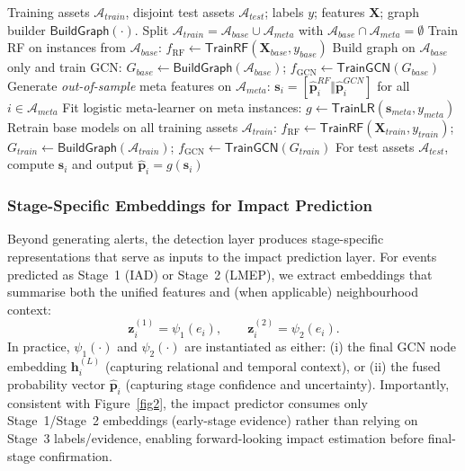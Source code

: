 \documentclass[pdflatex,sn-mathphys-num]{sn-jnl}
\theoremstyle{thmstyleone}%
\theoremstyle{thmstyletwo}%
\theoremstyle{thmstylethree}%
\begin{document}
\begin{algorithm}[!t]
\caption{Asset-disjoint stacking protocol (RF--GCN $\rightarrow$ logistic meta-learner)}
\label{alg:stacking_protocol}
\begin{algorithmic}[1]
\Require Training assets $\mathcal{A}_{train}$, disjoint test assets $\mathcal{A}_{test}$; labels $y$; features $\mathbf{X}$; graph builder $\mathsf{BuildGraph}(\cdot)$.
\State Split $\mathcal{A}_{train} = \mathcal{A}_{base} \cup \mathcal{A}_{meta}$ with $\mathcal{A}_{base} \cap \mathcal{A}_{meta} = \emptyset$
\State Train RF on instances from $\mathcal{A}_{base}$: $f_{\mathrm{RF}} \leftarrow \mathsf{TrainRF}(\mathbf{X}_{base}, y_{base})$
\State Build graph on $\mathcal{A}_{base}$ only and train GCN: $G_{base}\leftarrow \mathsf{BuildGraph}(\mathcal{A}_{base})$; $f_{\mathrm{GCN}} \leftarrow \mathsf{TrainGCN}(G_{base})$
\State Generate \emph{out-of-sample} meta features on $\mathcal{A}_{meta}$:
$\mathbf{s}_i = [\hat{\mathbf{p}}^{RF}_i \Vert \hat{\mathbf{p}}^{GCN}_i]$ for all $i\in \mathcal{A}_{meta}$
\State Fit logistic meta-learner on meta instances: $g \leftarrow \mathsf{TrainLR}(\mathbf{s}_{meta}, y_{meta})$
\State Retrain base models on all training assets $\mathcal{A}_{train}$:
$f_{\mathrm{RF}} \leftarrow \mathsf{TrainRF}(\mathbf{X}_{train}, y_{train})$; $G_{train}\leftarrow \mathsf{BuildGraph}(\mathcal{A}_{train})$; $f_{\mathrm{GCN}} \leftarrow \mathsf{TrainGCN}(G_{train})$
\State For test assets $\mathcal{A}_{test}$, compute $\mathbf{s}_i$ and output $\hat{\mathbf{p}}_i = g(\mathbf{s}_i)$
\end{algorithmic}
\end{algorithm}


\subsubsection{Stage-Specific Embeddings for Impact Prediction}
\label{sec:framework_embeddings}
Beyond generating alerts, the detection layer produces stage-specific representations that serve as inputs to the impact prediction layer. For events predicted as Stage~1 (IAD) or Stage~2 (LMEP), we extract embeddings that summarise both the unified features and (when applicable) neighbourhood context:
\begin{equation}
\mathbf{z}^{(1)}_i = \psi_1(e_i), 
\qquad 
\mathbf{z}^{(2)}_i = \psi_2(e_i).
\end{equation}
In practice, $\psi_1(\cdot)$ and $\psi_2(\cdot)$ are instantiated as either: (i) the final GCN node embedding $\mathbf{h}^{(L)}_i$ (capturing relational and temporal context), or (ii) the fused probability vector $\hat{\mathbf{p}}_i$ (capturing stage confidence and uncertainty). Importantly, consistent with Figure~\ref{fig2}, the impact predictor consumes only Stage~1/Stage~2 embeddings (early-stage evidence) rather than relying on Stage~3 labels/evidence, enabling forward-looking impact estimation before final-stage confirmation.
\end{document}
